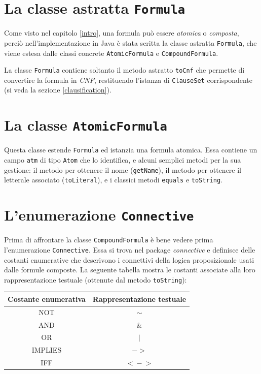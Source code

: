 \documentclass[a4paper,12pt]{report}
\begin{document}
\section{La classe astratta \texttt{Formula}}
Come visto nel capitolo \ref{intro}, una formula può essere \emph{atomica} o \emph{composta}, perciò nell'implementazione in Java è stata scritta la classe astratta \texttt{Formula}, che viene estesa dalle classi concrete \texttt{AtomicFormula} e \texttt{CompoundFormula}.

La classe \texttt{Formula} contiene soltanto il metodo astratto \texttt{toCnf} che permette di convertire la formula in \emph{CNF}, restituendo l'istanza di \texttt{ClauseSet} corrispondente (si veda la sezione \ref{clausification}).

\section{La classe \texttt{AtomicFormula}}
\label{AtomicFormula}
Questa classe estende \texttt{Formula} ed istanzia una formula atomica. Essa contiene un campo \texttt{atm} di tipo \texttt{Atom} che lo identifica, e alcuni semplici metodi per la sua gestione: il metodo per ottenere il nome (\texttt{getName}), il metodo per ottenere il letterale associato (\texttt{toLiteral}), e i classici metodi \texttt{equals} e \texttt{toString}.

\section{L'enumerazione \texttt{Connective}}
Prima di affrontare la classe \texttt{CompoundFormula} è bene vedere prima l'enumerazione \texttt{Connective}. Essa si trova nel package \emph{connective} e definisce delle costanti enumerative che descrivono i connettivi della logica proposizionale usati dalle formule composte. La seguente tabella mostra le costanti associate alla loro rappresentazione testuale (ottenute dal metodo \texttt{toString}):
\begin{table}[H]
    \centering
    \begin{tabular}{|c||c|}
        \hline
        \textbf{Costante enumerativa} & \textbf{Rappresentazione testuale} \\
        \hline\hline
        NOT & $\sim$ \\
        \hline
        AND & $\&$ \\
        \hline
        OR & $|$ \\
        \hline
        IMPLIES & $-\!>$ \\
        \hline
        IFF & $<\!-\!>$ \\
        \hline
    \end{tabular}
\end{table}
\end{document}
